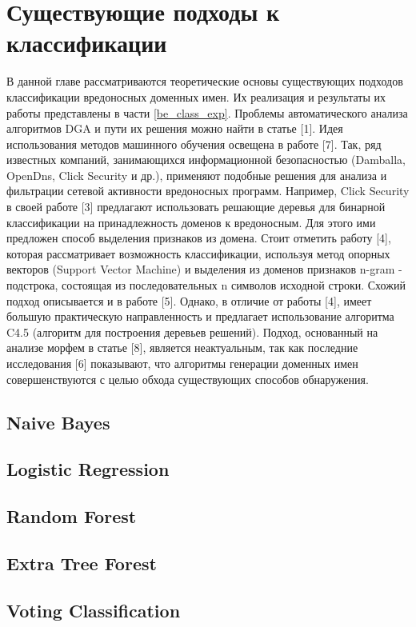 \section{Существующие подходы к классификации}\label{be_class}
В данной главе рассматриваются теоретические основы существующих подходов классификации вредоносных доменных имен. Их реализация и результаты их работы представлены в части \ref{be_class_exp}.
Проблемы автоматического анализа алгоритмов DGA и пути их решения можно найти в статье [1]. Идея использования методов машинного обучения освещена в работе [7]. Так, ряд известных компаний, занимающихся информационной безопасностью (Damballa, OpenDns, Click Security и др.), применяют подобные решения для анализа и фильтрации сетевой активности вредоносных программ. Например, Click Security в своей работе [3] предлагают использовать решающие деревья для бинарной классификации на принадлежность доменов к вредоносным. Для этого ими предложен способ выделения признаков из домена. Стоит отметить работу [4], которая рассматривает возможность классификации, используя метод опорных векторов (Support Vector Machine) и выделения из доменов признаков n-gram - подстрока, состоящая из последовательных n символов исходной строки. Схожий подход описывается и в работе [5]. Однако, в отличие от работы [4], имеет большую практическую направленность и предлагает использование алгоритма C4.5 (алгоритм для построения деревьев решений). Подход, основанный на анализе морфем в статье [8], является неактуальным, так как последние исследования [6] показывают, что алгоритмы генерации доменных имен совершенствуются с целью обхода существующих способов обнаружения.
    \subsection{Naive Bayes}
    \subsection{Logistic Regression}
    \subsection{Random Forest}
    \subsection{Extra Tree Forest}
    \subsection{Voting Classification}
\clearpage

